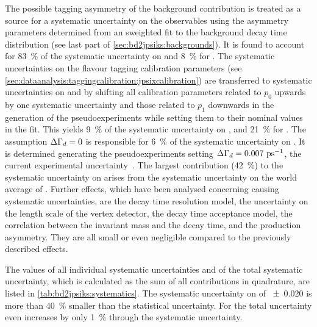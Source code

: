 The possible tagging asymmetry of the background contribution is treated as a
source for a systematic uncertainty on the \CP observables using the asymmetry
parameters determined from an sweighted fit to the background decay time
distribution (see last part of \cref{sec:bd2jpsiks:backgrounds}). It is found
to account for \SI{83}{\percent} of the systematic uncertainty on \SJpsiKS and
\SI{8}{\percent} for \CJpsiKS. The systematic uncertainties on the flavour
tagging calibration parameters (see
\cref{sec:dataanalysis:taggingcalibration:jpsixcalibration}) are transferred
to systematic uncertainties on \SJpsiKS and \CJpsiKS by shifting all
calibration parameters related to $p_0$ upwards by one systematic uncertainty
and those related to $p_1$ downwards in the generation of the
pseudoexperiments while setting them to their nominal values in the fit. This
yields \SI{9}{\percent} of the systematic uncertainty on \SJpsiKS, and
\SI{21}{\percent} for \CJpsiKS. The assumption ${\Delta\Gamma_{{d}}} = 0$ is responsible for
\SI{6}{\percent} of the systematic uncertainty on \SJpsiKS. It is determined
generating the pseudoexperiments setting ${\Delta\Gamma_{{d}}} = \SI{0.007}{\ensuremath{{\mathrm{ \,ps^{-1}}}}}$, the
current experimental uncertainty~\cite{PDG2014}. The largest contribution
(\SI{42}{\percent}) to the systematic uncertainty on \CJpsiKS arises from the
systematic uncertainty on the world average of \dmd. Further effects, which
have been analysed concerning causing systematic uncertainties, are the decay
time resolution model, the uncertainty on the length scale of the vertex
detector, the decay time acceptance model, the correlation between the
invariant mass and the decay time, and the production asymmetry. They are all
small or even negligible compared to the previously described effects.

The values of all individual systematic uncertainties and of the total
systematic uncertainty, which is calculated as the sum of all contributions in
quadrature, are listed in \cref{tab:bd2jpsiks:systematics}. The systematic
uncertainty on \SJpsiKS of \num{\pm0.020} is more than \SI{40}{\percent}
smaller than the statistical uncertainty. For \CJpsiKS the total uncertainty
even increases by only \SI{1}{\percent} through the systematic uncertainty.

